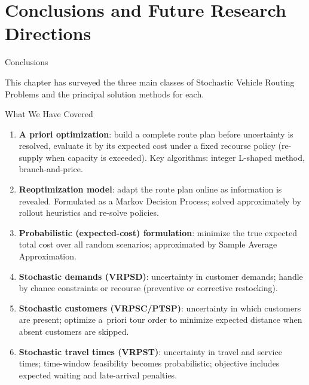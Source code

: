 \documentclass[aspectratio=169,10pt]{beamer}
\begin{document}
\section{Conclusions and Future Research Directions}

\begin{frame}[allowframebreaks]{Conclusions}

  This chapter has surveyed the three main classes of Stochastic Vehicle
  Routing Problems and the principal solution methods for each.

  \begin{block}{What We Have Covered}
    \begin{enumerate}
      \item \textbf{A priori optimization}: build a complete route plan
            before uncertainty is resolved, evaluate it by its expected
            cost under a fixed recourse policy (re-supply when capacity
            is exceeded).  Key algorithms: integer L-shaped method,
            branch-and-price.

      \item \textbf{Reoptimization model}: adapt the route plan online as
            information is revealed.  Formulated as a Markov Decision
            Process; solved approximately by rollout heuristics and
            re-solve policies.

      \item \textbf{Probabilistic (expected-cost) formulation}: minimize
            the true expected total cost over all random scenarios;
            approximated by Sample Average Approximation.

      \item \textbf{Stochastic demands (VRPSD)}: uncertainty in customer
            demands; handle by chance constraints or recourse (preventive
            or corrective restocking).

      \item \textbf{Stochastic customers (VRPSC/PTSP)}: uncertainty in
            which customers are present; optimize a~priori tour order to
            minimize expected distance when absent customers are skipped.

      \item \textbf{Stochastic travel times (VRPST)}: uncertainty in
            travel and service times; time-window feasibility becomes
            probabilistic; objective includes expected waiting and
            late-arrival penalties.
    \end{enumerate}
  \end{block}


\end{frame}
\end{document}
